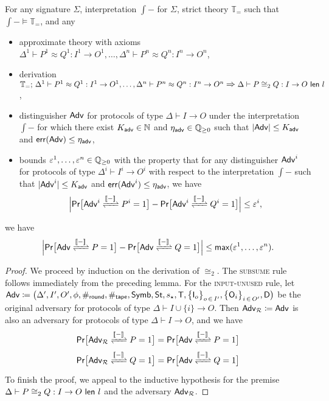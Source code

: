 \begin{lemma}\label{lem:soundness_congruence_approximate_2}
For any \ipdl signature $\Sigma$, interpretation $\int{-}$ for $\Sigma$, strict \ipdl theory $\mathbb{T}_=$ such that $\int{-} \vDash \mathbb{T}_=$, and any
\begin{itemize}
\item approximate \ipdl theory with axioms $\Delta^1 \vdash P^1 \approx Q^1 : I^1 \to O^1, \ldots, \Delta^n \vdash P^n \approx Q^n : I^n \to O^n$,

\item derivation $\mathbb{T}_=; \, \Delta^1 \vdash P^1 \approx Q^1 : I^1 \to O^1, \ldots, \Delta^n \vdash P^n \approx Q^n : I^n \to O^n \; \mathlarger{\mathlarger{\Rightarrow}} \; \Delta \vdash \lapproxcong{P}{Q}{I}{O}{l}{2}$,

\item distinguisher $\Adv$ for protocols of type $\Delta \vdash I \to O$ under the interpretation $\int{-}$ for which there exist $K_\adv \in \nat$ and $\eta_\adv \in \rat_{\geq 0}$ such that $|\Adv| \leq K_\adv$ and $\err(\Adv) \leq \eta_\adv$,

\item bounds $\varepsilon^1,\ldots,\varepsilon^n \in \rat_{\geq 0}$ with the property that for any distinguisher $\Adv^i$ for protocols of type $\Delta^i \vdash I^i \to O^i$ with respect to the interpretation $\int{-}$ such that $|\Adv^i| \leq K_\adv$ and $\err(\Adv^i) \leq \eta_\adv$, we have
\[\Big|\mathsf{Pr}\big[\interaction{\Adv^i}{P^i}{\int{-}} = 1\big] - \mathsf{Pr}\big[\interaction{\Adv^i}{Q^i}{\int{-}} = 1\big]\Big| \leq \varepsilon^i,\]
\end{itemize}
we have
\[\Big|\mathsf{Pr}\big[\interaction{\Adv}{P}{\int{-}} = 1\big] - \mathsf{Pr}\big[\interaction{\Adv}{Q}{\int{-}} = 1\big]\Big| \leq \max(\varepsilon^1,\ldots,\varepsilon^n).\]
\end{lemma}

\begin{proof}
We proceed by induction on the derivation of $\cong_2$. The \textsc{subsume} rule follows immediately from the preceding lemma. For the \textsc{input-unused} rule, let $\Adv \coloneqq \big(\Delta', I', O', \phi, \#_\round, \#_\tape, \Symb, \St, s_\star, \Step, \big\{\In_o\big\}_{o \, \in \, I'}, \big\{\Out_i\big\}_{i \, \in \, O'}, \Dec\big)$ be the original adversary for protocols of type $\Delta \vdash I \cup \{i\} \to O$. Then $\Adv_\mathcal{R} \coloneqq \Adv$ is also an adversary for protocols of type $\Delta \vdash I \to O$, and we have
\begin{align*}
& \mathsf{Pr}\big[\interaction{\Adv_\mathcal{R}}{P}{\int{-}} = 1\big] = \mathsf{Pr}\big[\interaction{\Adv}{P}{\int{-}} = 1\big] \\
& \mathsf{Pr}\big[\interaction{\Adv_\mathcal{R}}{Q}{\int{-}} = 1\big] = \mathsf{Pr}\big[\interaction{\Adv}{Q}{\int{-}} = 1\big]
\end{align*}
To finish the proof, we appeal to the inductive hypothesis for the premise $\Delta \vdash \lapproxcong{P}{Q}{I}{O}{l}{2}$ and the adversary $\Adv_\mathcal{R}$.
\end{proof}

